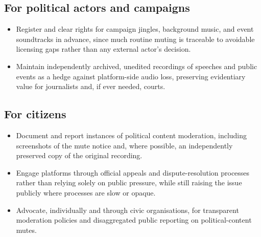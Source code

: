 \documentclass{article}
\begin{document}
\subsection*{For political actors and campaigns}
\begin{itemize}


\item Register and clear rights for campaign jingles, background music, and event soundtracks in advance, since much routine muting is traceable to avoidable licensing gaps rather than any external actor’s decision.
\item Maintain independently archived, unedited recordings of speeches and public events as a hedge against platform-side audio loss, preserving evidentiary value for journalists and, if ever needed, courts.
\end{itemize}

\subsection*{For citizens}
\begin{itemize}


\item Document and report instances of political content moderation, including screenshots of the mute notice and, where possible, an independently preserved copy of the original recording.
\item Engage platforms through official appeals and dispute-resolution processes rather than relying solely on public pressure, while still raising the issue publicly where processes are slow or opaque.
\item Advocate, individually and through civic organisations, for transparent moderation policies and disaggregated public reporting on political-content mutes.
\end{itemize}
\end{document}
